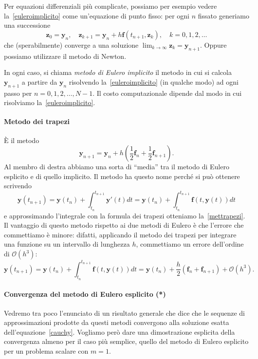 \documentclass[a4paper]{report}
\theoremstyle{definiton}
\theoremstyle{remark}
\newcommand{\y}{\mathbf{y}}
\newcommand{\z}{\mathbf{z}}
\newcommand{\f}{\mathbf{f}}
\begin{document}
Per equazioni differenziali più complicate, possiamo per esempio vedere la~\eqref{euleroimplicito} come un'equazione di punto fisso: per ogni $n$ fissato generiamo una successione
\[
\z_0 = \y_n, \quad \z_{k+1} = \y_n + h \f(t_{n+1}, \z_k), \quad k=0,1,2,\dots
\]
che (sperabilmente) converge a una soluzione $\lim_{k\to\infty} \z_k = \y_{n+1}$. Oppure possiamo utilizzare il metodo di Newton. 

In ogni caso, si chiama \emph{metodo di Eulero implicito} il metodo in cui si calcola $\y_{n+1}$ a partire da $\y_n$ risolvendo la~\eqref{euleroimplicito} (in qualche modo) ad ogni passo per $n=0,1,2,\dots,N-1$. Il costo computazionale dipende dal modo in cui risolviamo la~\eqref{euleroimplicito}.


\paragraph{Metodo dei trapezi}
È il metodo
\begin{equation} \label{mettrapezi}
    \y_{n+1} = \y_n + h\left(\frac12 \f_n + \frac12 \f_{n+1}\right).    
\end{equation}
Al membro di destra abbiamo una sorta di ``media'' tra il metodo di Eulero esplicito e di quello implicito. Il metodo ha questo nome perché si può ottenere scrivendo
\[
\y(t_{n+1}) = \y(t_n) + \int_{t_n}^{t_{n+1}} \y'(t) dt = \y(t_n) + \int_{t_n}^{t_{n+1}} \f(t,\y(t)) dt
\]
e approssimando l'integrale con la formula dei trapezi otteniamo la~\eqref{mettrapezi}. Il vantaggio di questo metodo rispetto ai due metodi di Eulero è che l'errore che commettiamo è minore: difatti, applicando il metodo dei trapezi per integrare una funzione su un intervallo di lunghezza $h$, commettiamo un errore dell'ordine di $\mathcal{O}(h^3)$:
\begin{equation} \label{trapezi_taylor}
    \y(t_{n+1}) = \y(t_n) + \int_{t_n}^{t_{n+1}} \f(t,\y(t)) dt = \y(t_n) + \frac{h}{2}(\f_n + \f_{n+1}) + \mathcal{O}(h^3).
\end{equation}
\paragraph{Convergenza del metodo di Eulero esplicito (*)}
Vedremo tra poco l'enunciato di un risultato generale che dice che le sequenze di approssimazioni prodotte da questi metodi convergono alla soluzione esatta dell'equazione~\eqref{cauchy}. Vogliamo però dare una dimostrazione esplicita della convergenza almeno per il caso più semplice, quello del metodo di Eulero esplicito per un problema scalare con $m=1$.
\end{document}
